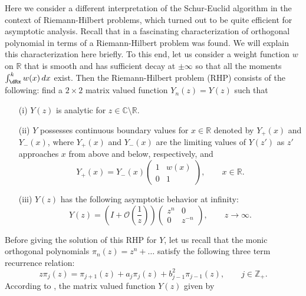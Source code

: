 \documentclass{amsart}
\theoremstyle{remark}
\numberwithin{equation}{section}
\begin{document}
Here we consider a different interpretation of the Schur-Euclid algorithm in the context of Riemann-Hilbert problems,
which turned out to be quite efficient for asymptotic analysis. Recall that in \cite{FIK1992} a fascinating characterization of
orthogonal polynomial in terms of a Riemann-Hilbert problem was found.
We will explain this characterization here briefly. To this end, let us consider a weight function $w$ on ${{\mathbb R}}$ that is smooth and has sufficient decay at $\pm\infty$ so that
all the moments $\int_\dRx^kw(x)\,dx$ exist. Then the Riemann-Hilbert problem (RHP) consists of the following:
find a $2\times 2$ matrix valued function $Y_n(z)=Y(z)$ such that
\begin{enumerate}
    \item[(i)]
        $Y(z)$ is  analytic for $z\in{{\mathbb C}} \setminus {{\mathbb R}}$.
    \item[(ii)]
        $Y$ possesses continuous boundary values for $x\in{{\mathbb R}}$
        denoted by $Y_{+}(x)$ and $Y_{-}(x)$, where $Y_{+}(x)$ and $Y_{-}(x)$
        are the limiting values of $Y(z')$ as $z'$ approaches $x$ from
        above and below, respectively, and
        \begin{equation}\label{RHPYb}
            Y_+(x) = Y_-(x)
            \begin{pmatrix}
                1 & w(x) \\
                0 & 1
            \end{pmatrix},
            \qquad x\in{{\mathbb R}}.
        \end{equation}
    \item[(iii)]
        $Y(z)$ has the following asymptotic behavior at infinity:
        \begin{equation} \label{RHPYc}
            Y(z)= \left(I+ \mathcal{O} \left( \frac{1}{z} \right)\right)
            \begin{pmatrix}
                z^{n} & 0 \\
                0 & z^{-n}
            \end{pmatrix}, \qquad z \to\infty.
        \end{equation}
\end{enumerate}
Before giving the solution of this RHP for $Y$, let us recall that the monic orthogonal polynomials
$\pi_n(z)=z^n+\dots$ satisfy the following three term recurrence relation:
\[
z\pi_j(z)=\pi_{j+1}(z)+a_j\pi_{j}(z)+b_{j-1}^2\pi_{j-1}(z),\qquad j\in{{\mathbb Z}}_+.
\]
According to \cite{FIK1992}, the matrix valued function $Y(z)$ given by
\end{document}
